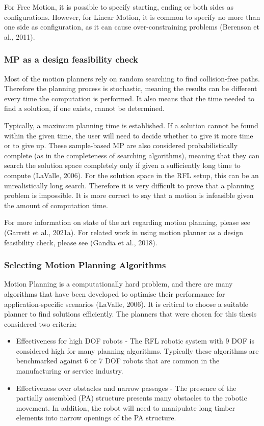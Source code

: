 For Free Motion, it is possible to specify starting, ending or both sides as configurations. However, for Linear Motion, it is common to specify no more than one side as configuration, as it can cause over-constraining problems (Berenson et al., 2011).

\subsubsection{MP as a design feasibility check}

Most of the motion planners rely on random searching to find collision-free paths. Therefore the planning process is stochastic, meaning the results can be different every time the computation is performed. It also means that the time needed to find a solution, if one exists, cannot be determined. 

Typically, a maximum planning time is established. If a solution cannot be found within the given time, the user will need to decide whether to give it more time or to give up. These sample-based MP are also considered probabilistically complete (as in the completeness of searching algorithms), meaning that they can search the solution space completely only if given a sufficiently long time to compute (LaValle, 2006). For the solution space in the RFL setup, this can be an unrealistically long search. Therefore it is very difficult to prove that a planning problem is impossible. It is more correct to say that a motion is infeasible given the amount of computation time.

For more information on state of the art regarding motion planning, please see (Garrett et al., 2021a). For related work in using motion planner as a design feasibility check, please see (Gandia et al., 2018). 

\subsubsection{Selecting Motion Planning Algorithms}

Motion Planning is a computationally hard problem, and there are many algorithms that have been developed to optimise their performance for application-specific scenarios (LaValle, 2006). It is critical to choose a suitable planner to find solutions efficiently. The planners that were chosen for this thesis considered two criteria:
    \begin{itemize}
    \item Effectiveness for high DOF robots - The RFL robotic system with 9 DOF is considered high for many planning algorithms. Typically these algorithms are benchmarked against 6 or 7 DOF robots that are common in the manufacturing or service industry.
    \item Effectiveness over obstacles and narrow passages - The presence of the partially assembled (PA) structure presents many obstacles to the robotic movement. In addition, the robot will need to manipulate long timber elements into narrow openings of the PA structure.
    \end{itemize}

